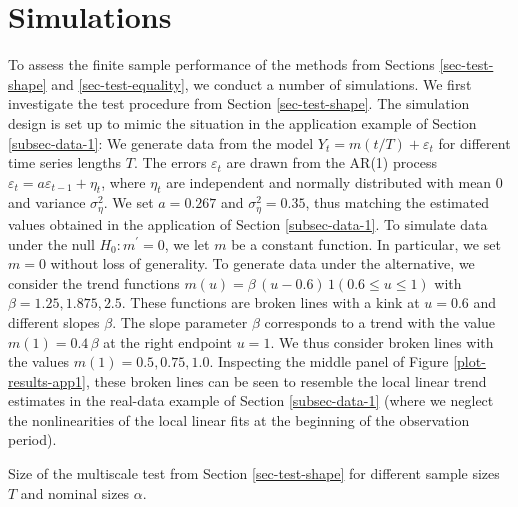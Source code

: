 
\section{Simulations}\label{sec-sim}


To assess the finite sample performance of the methods from Sections \ref{sec-test-shape} and \ref{sec-test-equality}, we conduct a number of simulations. We first investigate the test procedure from Section \ref{sec-test-shape}. The simulation design is set up to mimic the situation in the application example of Section \ref{subsec-data-1}: We generate data from the model $Y_t = m(t/T) + \varepsilon_t$ for different time series lengths $T$. The errors $\varepsilon_t$ are drawn from the AR(1) process $\varepsilon_t = a \varepsilon_{t-1} + \eta_t$, where $\eta_t$ are independent and normally distributed with mean $0$ and variance $\sigma_\eta^2$. We set $a = 0.267$ and $\sigma_\eta^2 = 0.35$, thus matching the estimated values obtained in the application of Section \ref{subsec-data-1}. To simulate data under the null $H_0: m^\prime = 0$, we let $m$ be a constant function. In particular, we set $m = 0$ without loss of generality. To generate data under the alternative, we consider the trend functions $m(u) = \beta \, (u - 0.6) \, 1(0.6 \le u \le 1)$ with $\beta = 1.25, 1.875, 2.5$. These functions are broken lines with a kink at $u = 0.6$ and different slopes $\beta$. The slope parameter $\beta$ corresponds to a trend with the value $m(1) = 0.4 \, \beta$ at the right endpoint $u = 1$. We thus consider broken lines with the values $m(1) = 0.5, 0.75, 1.0$. Inspecting the middle panel of Figure \ref{plot-results-app1}, these broken lines can be seen to resemble the local linear trend estimates in the real-data example of Section \ref{subsec-data-1} (where we neglect the nonlinearities of the local linear fits at the beginning of the observation period). 

\begin{table}[t]
\footnotesize{
\begin{center}
\caption{Size of the multiscale test from Section \ref{sec-test-shape} for different sample sizes $T$ and nominal sizes $\alpha$.}
\label{tab:size_ll_shape}
\renewcommand{\arraystretch}{1.2}

\end{center}}
\end{table}

